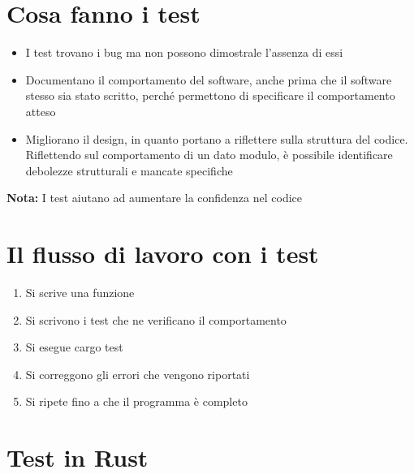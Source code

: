 \section{Cosa fanno i test}

\begin{itemize}
  \item I test trovano i bug ma non possono dimostrale l'assenza di essi
  \item Documentano il comportamento del software, anche prima che il software
        stesso sia stato scritto, perché permettono di specificare il comportamento
        atteso
  \item Migliorano il design, in quanto portano a riflettere sulla struttura
        del codice. Riflettendo sul comportamento di un dato modulo, è possibile
        identificare debolezze strutturali e mancate specifiche
\end{itemize}

\begin{tcolorbox}
  \textbf{Nota: } I test aiutano ad aumentare la confidenza nel codice
\end{tcolorbox}




\section{Il flusso di lavoro con i test}

\begin{enumerate}
  \item Si scrive una funzione
  \item Si scrivono i test che ne verificano il comportamento
  \item Si esegue cargo test
  \item Si correggono gli errori che vengono riportati
  \item Si ripete fino a che il programma è completo
\end{enumerate}

\section{Test in Rust}

